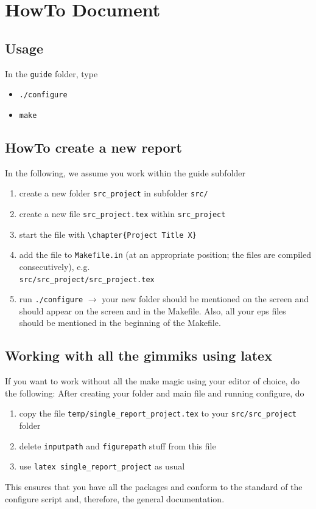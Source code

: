 \chapter{HowTo Document \ccarat{}} 

\newcommand{\test}[1]{\vec{#1}}

\section{Usage}

In the \verb|guide| folder, type
\begin{itemize}
\item \verb|./configure|
\item \verb|make|
\end{itemize}


\section{HowTo create a new report}
In the following, we assume you work within the guide subfolder
\begin{enumerate}
  \item create a new folder \verb|src_project| in subfolder \verb|src/|
  \item create a new file \verb|src_project.tex| within \verb|src_project|
  \item start the file with \verb|\chapter{Project Title X}|
  \item add the file to \texttt{Makefile.in} (at an appropriate position; the files are compiled consecutively), e.g.\\
  \verb|src/src_project/src_project.tex|
  \item run \verb|./configure| $\to$ your new folder should be mentioned on the screen and should appear on the screen and in the Makefile. Also, all your eps files should be mentioned in the beginning of the Makefile.
\end{enumerate}


\section{Working with all the gimmiks using latex}
If you want to work without all the make magic using your editor of choice, do the following:
After creating your folder and main file and running configure, do
\begin{enumerate}
 \item copy the file \verb|temp/single_report_project.tex| to your \verb|src/src_project| folder
 \item delete \verb|inputpath| and \verb|figurepath| stuff from this file
 \item use \verb|latex single_report_project| as usual
\end{enumerate}
This ensures that you have all the packages and conform to the standard of the configure script and, therefore, the general \ccarat{} documentation.


